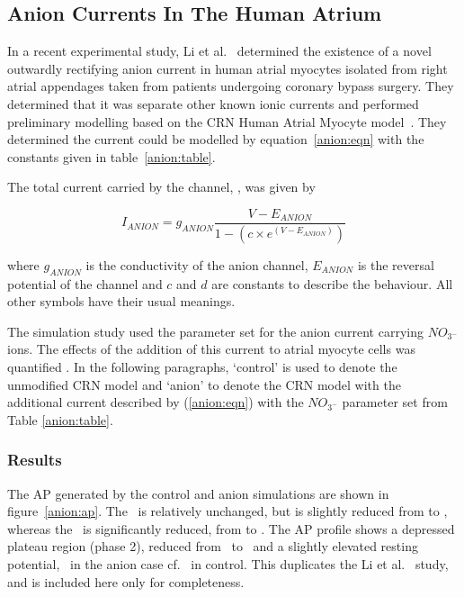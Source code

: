 \subsection{Anion Currents In The Human Atrium}

In a recent experimental study, Li et al.~\cite{li2007} determined the existence
of a novel outwardly rectifying anion current in human atrial myocytes isolated
from right atrial appendages taken from patients undergoing coronary bypass
surgery.  They determined that it was separate other known ionic currents and
performed preliminary modelling based on the CRN Human Atrial Myocyte
model~\cite{crn98}.  They determined the current could be modelled by
equation~\ref{anion:eqn} with the constants given in table~\ref{anion:table}.

The total current carried by the channel, , was given by

\begin{equation}
\label{anion:eqn}
I_{ANION} = g_{ANION} \frac{V-E_{ANION}}{1-\left(c\times e^{\left(V-E_{ANION}\right)}\right)}
\end{equation}

where $g_{ANION}$ is the conductivity of the anion channel, $E_{ANION}$ is
the reversal potential of the channel and $c$ and $d$ are constants to
describe the behaviour.  All other symbols have their usual meanings.

The simulation study used the parameter set for the anion current carrying
$NO_{3^{-}}$ ions.  The effects of the addition of this current to atrial
myocyte cells was quantified .  In the following
paragraphs, `control' is used to denote the unmodified CRN model and `anion' to
denote the CRN model with the additional current described by (\ref{anion:eqn})
with the $NO_{3^{-}}$ parameter set from Table \ref{anion:table}.

\subsubsection{Results}

The AP generated by the control and anion simulations are shown in
figure~\ref{anion:ap}.  The \apd\ is relatively unchanged, but is slightly
reduced from  to , whereas the \apd[50]\ is significantly
reduced, from  to .  The AP profile shows a depressed plateau region (phase
2), reduced from \ to \ and a slightly elevated resting potential,
\ in the anion case cf. \ in control.  This duplicates the Li et
al.~\cite{li2007} study, and is included here only for completeness.

